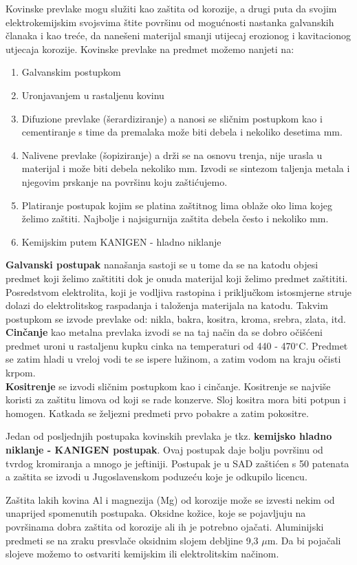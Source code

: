 \documentclass[a4paper,12pt]{article}
\numberwithin{figure}{section}
\begin{document}
Kovinske prevlake mogu služiti kao zaštita od korozije, a drugi puta da svojim elektrokemijskim svojsvima štite površinu od mogućnosti nastanka galvanskih članaka i kao treće, da nanešeni materijal smanji utijecaj erozionog i kavitacionog utjecaja korozije.
Kovinske prevlake na predmet možemo nanjeti na:
\begin{enumerate}
\item Galvanskim postupkom
\item Uronjavanjem u rastaljenu kovinu
\item Difuzione prevlake (šerardiziranje) a nanosi se sličnim postupkom kao i cementiranje s time da premalaka može biti debela i nekoliko desetima mm.
\item Nalivene prevlake (šopiziranje) a drži se na osnovu trenja, nije urasla u materijal i može biti debela nekoliko mm. Izvodi se sintezom taljenja metala i njegovim prskanje na površinu koju zaštićujemo.
\item Platiranje postupak kojim se platina zaštitnog lima oblaže oko lima kojeg želimo zaštiti. Najbolje i najsigurnija zaštita debela često i nekoliko mm.
\item Kemijskim putem KANIGEN - hladno niklanje 
\end{enumerate} 
\textbf{Galvanski postupak} nanašanja sastoji se u tome da se na katodu objesi predmet koji želimo zaštititi dok je onuda materijal koji želimo predmet zaštititi. Posredstvom elektrolita, koji je vodljiva rastopina i priključkom istosmjerne struje dolazi do elektrolitskog raspadanja i taloženja materijala na katodu. Takvim postupkom se izvode prevlake od: nikla, bakra, kositra, kroma, srebra, zlata, itd.\\
\textbf{Cinčanje} kao metalna prevlaka izvodi se na taj način da se dobro očišćeni predmet uroni u rastaljenu kupku cinka na temperaturi od 440 - 470$^{\circ}$C. Predmet se zatim hladi u vreloj vodi te se ispere lužinom, a zatim vodom na kraju očisti krpom.\\
\textbf{Kositrenje} se izvodi sličnim postupkom kao i cinčanje. Kositrenje se najviše koristi za zaštitu limova od koji se rade konzerve. Sloj kositra mora biti potpun i homogen. Katkada se željezni predmeti prvo pobakre a zatim pokositre.\par
Jedan od posljednjih postupaka kovinskih prevlaka je tkz. \textbf{kemijsko hladno niklanje - KANIGEN postupak}. Ovaj postupak daje bolju površinu od tvrdog kromiranja a mnogo je jeftiniji. Postupak je u SAD zaštićen s 50 patenata a zaštita se izvodi u Jugoslavenskom poduzeću koje je odkupilo licencu. \par
Zaštita lakih kovina Al i magnezija (Mg) od korozije može se izvesti nekim od unaprijed spomenutih postupaka. Oksidne kožice, koje se pojavljuju na površinama dobra zaštita od korozije ali ih je potrebno ojačati. Aluminijski predmeti se na zraku presvlače oksidnim slojem debljine 9,3 $\mu$m. Da bi pojačali slojeve možemo to ostvariti kemijskim ili elektrolitskim načinom.
\end{document}
